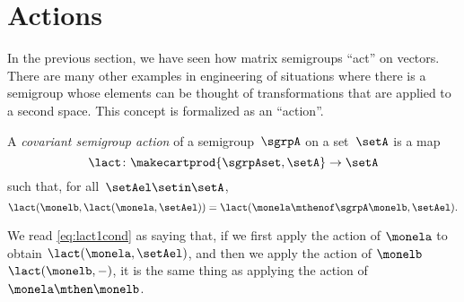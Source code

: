 
\section{Actions}
\label{sec:actions}
In the previous section, we have seen how matrix semigroups ``act'' on vectors.
There are many other examples in engineering of situations where there is a semigroup whose elements can be thought of transformations that are applied to a second space.
This concept is formalized as an ``action''.

\begin{ctdefinition}
    \label{def:semigroup-cov-action-prelim}
    A \emph{covariant semigroup action} of a semigroup~$\sgrpA$ on a set~$\setA$ is a map
    \begin{equation}
        \label{eq:lact}
        \lact \colon \makecartprod{\sgrpAset, \setA} \to \setA
    \end{equation}
    such that, for all~$\setAel \setin \setA$,
    \begin{equation}
        \label{eq:lact1cond}
        \lact(\monelb, \lact(\monela, \setAel)) = \lact(\monela \mthenof\sgrpA \monelb, \setAel).
    \end{equation}
\end{ctdefinition}

We read \cref{eq:lact1cond} as saying that, if we first apply the action of $\monela$ to obtain $\lact(\monela, \setAel)$,
and then we apply the action of $\monelb$ $\lact(\monelb, -)$, it is the same thing as applying the action of $\monela\mthen\monelb$.


